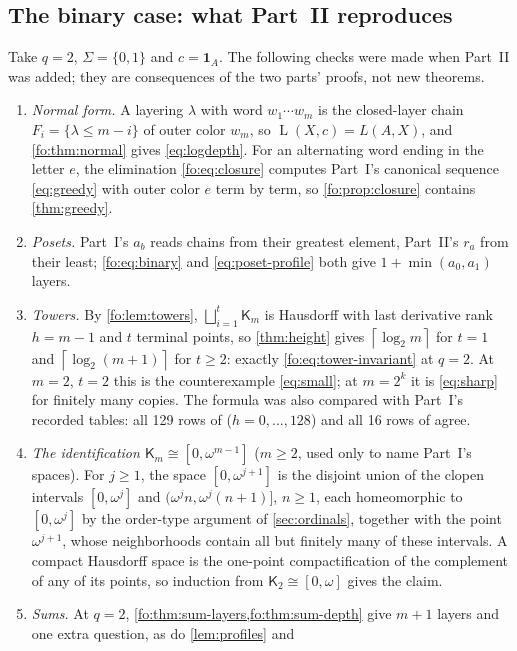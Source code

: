 \documentclass[11pt,letterpaper]{article}
\numberwithin{equation}{section}
\theoremstyle{definition}
\theoremstyle{remark}
\theoremstyle{definition}
\newcommand{\ceil}[1]{\left\lceil#1\right\rceil}
\newcommand{\layers}{\operatorname{L}}
\newcommand{\Tw}{\mathsf K}
\begin{document}
\subsection{The binary case: what Part~II reproduces}
\label{fo:sec:crosswalk}
Take $q=2$, $\Sigma=\{0,1\}$ and $c=\mathbf 1_A$. The following checks were
made when Part~II was added; they are consequences of the two parts' proofs,
not new theorems.
\begin{enumerate}
\item \emph{Normal form.} A layering $\lambda$ with word $w_1\cdots w_m$ is the
closed-layer chain $F_i=\{\lambda\le m-i\}$ of outer color $w_m$, so
$\layers(X,c)=L(A,X)$, and \cref{fo:thm:normal} gives \eqref{eq:logdepth}. For
an alternating word ending in the letter $e$, the elimination
\eqref{fo:eq:closure} computes Part~I's canonical sequence \eqref{eq:greedy}
with outer color $e$ term by term, so
\cref{fo:prop:closure} contains \cref{thm:greedy}.
\item \emph{Posets.} Part~I's $a_b$ reads chains from their greatest element,
Part~II's $r_a$ from their least; \eqref{fo:eq:binary} and
\eqref{eq:poset-profile} both give $1+\min(a_0,a_1)$ layers.
\item \emph{Towers.} By \cref{fo:lem:towers}, $\bigsqcup_{i=1}^t\Tw_m$ is
Hausdorff with last derivative rank $h=m-1$ and $t$ terminal points, so
\cref{thm:height} gives $\ceil{\log_2m}$ for $t=1$ and $\ceil{\log_2(m+1)}$ for
$t\ge2$: exactly \eqref{fo:eq:tower-invariant} at $q=2$. At $m=2$, $t=2$ this is
the counterexample \eqref{eq:small}; at $m=2^k$ it is \eqref{eq:sharp} for
finitely many copies. The formula was also compared with Part~I's recorded
tables: all 129 rows of  ($h=0,\ldots,128$) and
all 16 rows of  agree.
\item \emph{The identification $\Tw_m\cong[0,\omega^{m-1}]$} ($m\ge2$, used only
to name Part~I's spaces). For $j\ge1$, the space $[0,\omega^{j+1}]$ is the
disjoint union of the clopen intervals $[0,\omega^j]$ and
$(\omega^j n,\omega^j(n+1)]$, $n\ge1$, each homeomorphic to $[0,\omega^j]$ by
the order-type argument of \cref{sec:ordinals}, together with the point
$\omega^{j+1}$, whose neighborhoods contain all but finitely many of these
intervals. A compact Hausdorff space is the one-point compactification of the
complement of any of its points, so induction from $\Tw_2\cong[0,\omega]$
gives the claim.
\item \emph{Sums.} At $q=2$, \cref{fo:thm:sum-layers,fo:thm:sum-depth} give
$m+1$ layers and one extra question, as do \cref{lem:profiles} and

\end{enumerate}
\end{document}
